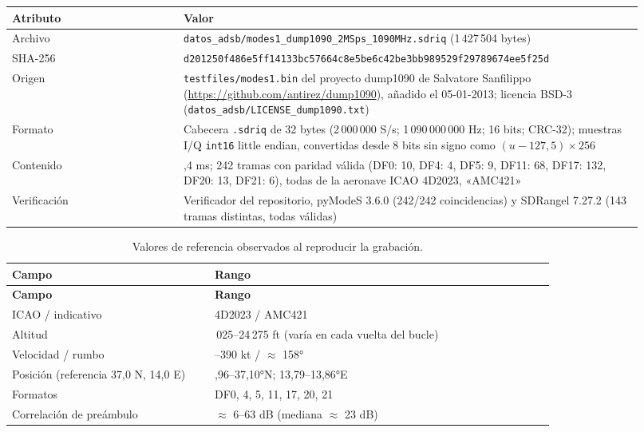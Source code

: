 \begin{longtable}{@{}>{\raggedright\arraybackslash}p{0.25\linewidth}>{\raggedright\arraybackslash}p{0.67\linewidth}@{}}
\toprule
\textbf{Atributo} & \textbf{Valor} \\
\midrule
\endhead
Archivo & {\ttfamily\nolinkurl{datos_adsb/modes1_dump1090_2MSps_1090MHz.sdriq}} (1\,427\,504 bytes) \\
SHA-256 & {\ttfamily\small\nolinkurl{d201250f486e5ff14133bc57664c8e5be6c42be3bb989529f29789674ee5f25d}} \\
Origen & \texttt{testfiles/modes1.bin} del proyecto dump1090 de Salvatore Sanfilippo (\url{https://github.com/antirez/dump1090}), añadido el 05-01-2013; licencia BSD-3 (\texttt{datos\_adsb/LICENSE\_dump1090.txt}) \\
Formato & Cabecera \texttt{.sdriq} de 32 bytes (2\,000\,000 S/s; 1\,090\,000\,000 Hz; 16 bits; CRC-32); muestras I/Q \texttt{int16} little endian, convertidas desde 8 bits sin signo como $(u-127{,}5)\times256$ \\
Contenido & 178,4 ms; 242 tramas con paridad válida (DF0: 10, DF4: 4, DF5: 9, DF11: 68, DF17: 132, DF20: 13, DF21: 6), todas de la aeronave ICAO 4D2023, «AMC421» \\
Verificación & Verificador del repositorio, pyModeS 3.6.0 (242/242 coincidencias) y SDRangel 7.27.2 (143 tramas distintas, todas válidas) \\
\bottomrule
\end{longtable}

\begin{longtable}{@{}>{\raggedright\arraybackslash}p{0.34\linewidth}>{\raggedright\arraybackslash}p{0.58\linewidth}@{}}
\caption{Valores de referencia observados al reproducir la grabación.}\label{tab:a-referencia}\\
\toprule
\textbf{Campo} & \textbf{Rango} \\
\midrule
\endfirsthead
\toprule
\textbf{Campo} & \textbf{Rango} \\
\midrule
\endhead
ICAO / indicativo & 4D2023 / AMC421 \\
Altitud & 20\,025--24\,275 ft (varía en cada vuelta del bucle) \\
Velocidad / rumbo & 371--390 kt / $\approx$ 158° \\
Posición (referencia 37,0 N, 14,0 E) & 36,96--37,10°N; 13,79--13,86°E \\
Formatos & DF0, 4, 5, 11, 17, 20, 21 \\
Correlación de preámbulo & $\approx$ 6--63 dB (mediana $\approx$ 23 dB) \\
\bottomrule
\end{longtable}

